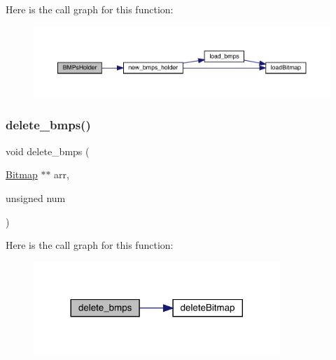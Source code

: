 Here is the call graph for this function\+:\nopagebreak
\begin{figure}[H]
\begin{center}
\leavevmode
\includegraphics[width=350pt]{group___b_m_ps_holder_gafd662085ea52a83586cddd30b6423c01_cgraph}
\end{center}
\end{figure}
\hypertarget{group___b_m_ps_holder_ga72dfdb9916627f68651174c037680533}{}\label{group___b_m_ps_holder_ga72dfdb9916627f68651174c037680533} 
\subsubsection{\texorpdfstring{delete\+\_\+bmps()}{delete\_bmps()}}
{\footnotesize\ttfamily void delete\+\_\+bmps (\begin{DoxyParamCaption}\item[{\hyperlink{struct_bitmap}{Bitmap} $\ast$$\ast$}]{arr,  }\item[{unsigned}]{num }\end{DoxyParamCaption})}

Here is the call graph for this function\+:\nopagebreak
\begin{figure}[H]
\begin{center}
\leavevmode
\includegraphics[width=264pt]{group___b_m_ps_holder_ga72dfdb9916627f68651174c037680533_cgraph}
\end{center}
\end{figure}
\hypertarget{group___b_m_ps_holder_gaa0a362e75eb034aa78e675ecb1b9c6da}{}\label{group___b_m_ps_holder_gaa0a362e75eb034aa78e675ecb1b9c6da} 
